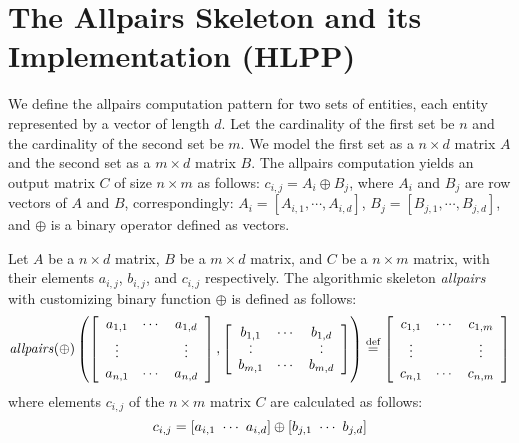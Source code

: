 \section{The Allpairs Skeleton and its Implementation (HLPP)}
\label{sec:allpairs_skeleton}

\label{sec:formal_def}
We define the allpairs computation pattern for two sets of entities, each entity represented by a vector of length $d$.
Let the cardinality of the first set be $n$ and the cardinality of the second set be $m$.
We model the first set as a $n\times d$ matrix $A$ and the second set as a $m\times d$ matrix $B$.
The allpairs computation yields an output matrix $C$ of size $n\times m$ as follows:
$c_{i, j} = A_i \oplus B_j$, where $A_i$ and $B_j$ are row vectors of $A$ and $B$, correspondingly:
$A_i = [A_{i,1}, \cdots, A_{i, d}]$, $B_j = [B_{j,1}, \cdots, B_{j,d}]$, and $\oplus$ is a binary operator defined as vectors.

\begin{definition}
  \label{def:allpairs}
  Let $A$ be a $n\times d$ matrix, $B$ be a $m\times d$ matrix, and $C$ be a $n\times m$ matrix, with their elements $a_{i,j}$, $b_{i,j}$, and $c_{i,j}$ respectively.
  The algorithmic skeleton \emph{allpairs} with customizing binary function $\oplus$ is defined as follows:
  \[
    \allpairs(\oplus)\left(
      \left[ \begin{array}{ccc}%
 	      a_{1,1} & \cdots & a_{1,d}\\[.25em]
       	\vdots & & \vdots\\[.25em]
       	a_{n,1} & \cdots & a_{n,d}%
     	\end{array}\right],%
      \left[ \begin{array}{ccc}%
       	b_{1,1} & \cdots & b_{1,d}\\[-.25em]
       	\cdot & & \cdot\\[-.75em]
       	\cdot & & \cdot\\[-.25em]
       	b_{m,1} & \cdots & b_{m,d}%
   	\end{array}\right]\right)%
  	\eqdef 
      \left[ \begin{array}{ccc}%
 	      c_{1,1} & \cdots & c_{1,m}\\[.25em]
       	\vdots & & \vdots\\[.25em]
        c_{n,1} & \cdots & c_{n,m}%
   	\end{array}\right]
  \]
  where elements $c_{i,j}$ of the $n\times m$ matrix $C$ are calculated as follows:
  \[
	  c_{i,j} = \left[a_{i,1}\ \cdots\ a_{i,d}\right] \oplus \left[b_{j,1}\ \cdots\ b_{j,d}\right]
  \]
\end{definition}

